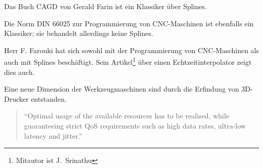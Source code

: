 \documentclass[12pt,a4paper]{scrbook}
\begin{document}
 
 
Das Buch CAGD von Gerald Farin ist ein Klassiker über Splines. \cite{Farin2001}

\bigskip

Die Norm DIN 66025 zur Programmierung von CNC-Maschinen ist ebenfalls ein Klassiker; sie behandelt allerdings keine Splines. \cite{DIN66025}

\bigskip

Herr F. Farouki hat sich sowohl mit der Programmierung von CNC-Maschinen als auch mit Splines beschäftigt. 
Sein Artikel\footnote{Mitautor ist J.~Srinathu} über einen Echtzeitinterpolator zeigt dies auch. \cite{Farouki2017}

\bigskip

Eine neue Dimension der Werkzeugmaschinen sind durch die Erfindung von 3D-Drucker entstanden. \cite{Patent3D}

\begin{quotation} 
``Optimal usage of the available resources has to be realised, while guaranteeing strict QoS requirements such as high data rates, ultra-low latency and jitter.''~\cite{Zafeiropoulos2020}
\end{quotation}
 
\printbibliography
    
\end{document}
